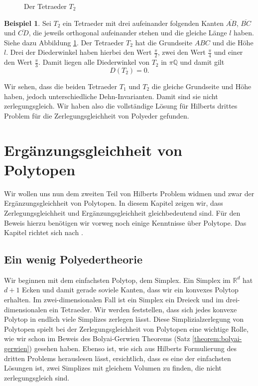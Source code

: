 \documentclass[11pt,titlepage]{article}
\newcommand{\setQ}{\mathbb{Q}}
\newcommand{\setR}{\mathbb{R}}
\theoremstyle{definition}
\newtheorem{example}[theorem]{Beispiel}
\theoremstyle{remark}
\begin{document}
\begin{figure}[!htbp]
\begin{minipage}[m]{0.4\textwidth}
			\caption{Der Tetraeder $T_2$}
			\label{Abb.6}
		\end{minipage}
	\end{figure}

	\begin{example}
		Sei $T_2$ ein Tetraeder mit drei aufeinander folgenden Kanten 
		$\overline{AB}$, $\overline{BC}$ und $\overline{CD}$, die jeweils 
		orthogonal aufeinander stehen und die gleiche Länge $l$ haben. 
		Siehe dazu Abbildung \ref{Abb.6}. 
		Der Tetraeder $T_2$ hat die Grundseite $ABC$ und die Höhe $l$. 
		Drei der Diederwinkel haben hierbei den Wert $\frac{\pi}{2}$, 
		zwei den Wert $\frac{\pi}{4}$ und einer den Wert $\frac{\pi}{3}$. 
		Damit liegen alle Diederwinkel von $T_2$ in $\pi\setQ$ und damit 
		gilt 
		\[D(T_2)=0.\]
	\end{example}
	
	Wir sehen, dass die beiden Tetraeder $T_1$ und $T_2$ die 
	gleiche Grundseite und Höhe haben, jedoch unterschiedliche Dehn-Invarianten. 
	Damit sind sie nicht zerlegungsgleich. Wir haben also die vollständige 
	Lösung für Hilberts drittes Problem für die Zerlegungsgleichheit von 
	Polyeder gefunden.
	
	\newpage
	
	\section{Ergänzungsgleichheit von Polytopen}
	
	Wir wollen uns nun dem zweiten Teil von Hilberts Problem widmen und zwar der 
	Ergänzungsgleichheit von Polytopen. In diesem Kapitel zeigen wir, dass 
	Zerlegungsgleichheit und Ergänzungsgleichheit gleichbedeutend sind. Für den 
	Beweis hierzu benötigen wir vorweg noch einige Kenntnisse über Polytope. Das Kapitel richtet sich nach 
	\cite{Hadwiger}. 
	
	\subsection{Ein wenig Polyedertheorie}
	
	Wir beginnen mit dem einfachsten Polytop, dem Simplex. Ein Simplex 
	im $\setR^d$ hat 
	$d+1$ Ecken und damit gerade soviele Kanten, dass 
	wir ein konvexes Polytop erhalten. Im zwei-dimensionalen Fall ist ein 
	Simplex ein Dreieck und im drei-dimensionalen ein Tetraeder. Wir werden 
	feststellen, dass sich jedes konvexe Polytop in endlich viele Simplizes 
	zerlegen lässt. Diese Simplizialzerlegung von Polytopen spielt bei 
	der Zerlegungsgleichheit von Polytopen eine wichtige Rolle, wie wir schon im 
	Beweis des Bolyai-Gerwien Theorems (Satz \ref{theorem:bolyai-gerwien}) 
	gesehen haben. Ebenso ist, wie sich aus Hilberts Formulierung des 
	dritten Problems herauslesen lässt, ersichtlich, dass es eine der einfachsten Lösungen ist, zwei Simplizes mit gleichem Volumen zu finden, die nicht zerlegungsgleich sind.
	
\end{document}
